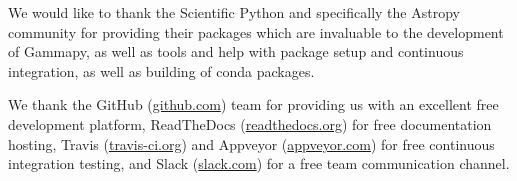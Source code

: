 \documentclass{PoS}
\newcommand{\urlGithub}{\href{https://github.com}{github.com}}
\newcommand{\urlRtd}{\href{https://readthedocs.org}{readthedocs.org}}
\newcommand{\urlTravis}{\href{https://travis-ci.org}{travis-ci.org}}
\newcommand{\urlAppveyor}{\href{https://appveyor.com}{appveyor.com}}
\newcommand{\urlSlack}{\href{https://slack.com}{slack.com}}
\begin{document}
We would like to thank the Scientific Python and specifically the Astropy
community for providing their packages which are invaluable to the development
of Gammapy, as well as tools and help with package setup and continuous
integration, as well as building of conda packages.

We thank the GitHub (\urlGithub) team for providing us with an excellent free
development platform, ReadTheDocs (\urlRtd) for free documentation hosting,
Travis (\urlTravis) and Appveyor (\urlAppveyor) for free continuous integration
testing, and Slack (\urlSlack) for a free team communication channel.



\end{document}
